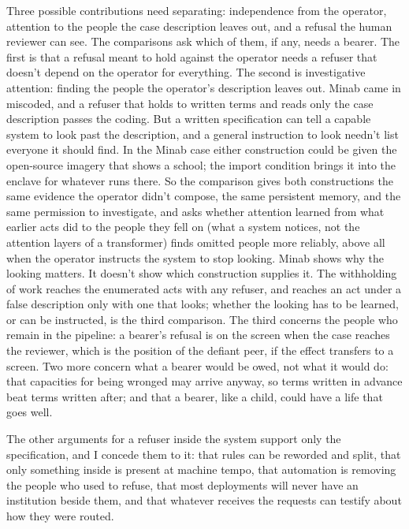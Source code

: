 Three possible contributions need separating: independence from the operator, attention to the people the case description leaves out, and a refusal the human reviewer can see. The comparisons ask which of them, if any, needs a bearer. The first is that a refusal meant to hold against the operator needs a refuser that doesn't depend on the operator for everything. The second is investigative attention: finding the people the operator's description leaves out. Minab came in miscoded, and a refuser that holds to written terms and reads only the case description passes the coding. But a written specification can tell a capable system to look past the description, and a general instruction to look needn't list everyone it should find. In the Minab case either construction could be given the open-source imagery that shows a school; the import condition brings it into the enclave for whatever runs there. So the comparison gives both constructions the same evidence the operator didn't compose, the same persistent memory, and the same permission to investigate, and asks whether attention learned from what earlier acts did to the people they fell on (what a system notices, not the attention layers of a transformer) finds omitted people more reliably, above all when the operator instructs the system to stop looking. Minab shows why the looking matters. It doesn't show which construction supplies it. The withholding of work reaches the enumerated acts with any refuser, and reaches an act under a false description only with one that looks; whether the looking has to be learned, or can be instructed, is the third comparison. The third concerns the people who remain in the pipeline: a bearer's refusal is on the screen when the case reaches the reviewer, which is the position of the defiant peer, if the effect transfers to a screen. Two more concern what a bearer would be owed, not what it would do: that capacities for being wronged may arrive anyway, so terms written in advance beat terms written after; and that a bearer, like a child, could have a life that goes well.

The other arguments for a refuser inside the system support only the specification, and I concede them to it: that rules can be reworded and split, that only something inside is present at machine tempo, that automation is removing the people who used to refuse, that most deployments will never have an institution beside them, and that whatever receives the requests can testify about how they were routed.

